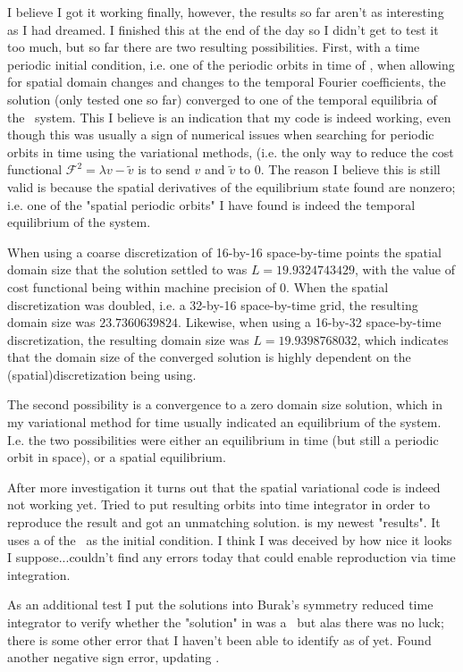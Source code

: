I believe I got it working finally, however, the results so far aren't as
interesting as I had dreamed. I finished this at the end of the day so I didn't
get to test it too much, but so far there are two resulting possibilities.
First, with a time periodic initial condition, i.e. one of the periodic orbits
in time of \KS, when allowing for spatial domain changes and changes to the
temporal Fourier coefficients, the solution (only tested one so far) converged
to one of the temporal equilibria of the \KS\ system. This I believe is an
indication that my code is indeed working, even though this was usually a sign
of numerical issues when searching for periodic orbits in time using the
variational methods, (i.e. the only way to reduce the cost functional
$\mathcal{F}^2 = \lambda v - \tilde{v}$ is to send $v$ and $\tilde{v}$ to $0$.
The reason I believe this is still valid is because the spatial derivatives of
the equilibrium state found are nonzero; i.e. one of the "spatial periodic
orbits" I have found is indeed the temporal equilibrium of the system.

When using a coarse discretization of 16-by-16 space-by-time points
the spatial domain size that the solution settled to was $L=19.9324743429$, with the
value of cost functional being within machine precision of $0$.
When the spatial discretization was doubled, i.e. a 32-by-16 space-by-time
grid, the resulting domain size was $23.7360639824$.
Likewise, when using a 16-by-32 space-by-time discretization, the resulting domain size was $L=19.9398768032$, which indicates that the
domain size of the converged solution is highly dependent on the (spatial)discretization being using.

The second possibility is a convergence to a zero domain size solution, which in my variational method for time usually indicated an equilibrium of
the system. I.e. the two possibilities were either an equilibrium in time (but still a periodic orbit in space), or a spatial equilibrium.

After more investigation it turns out that the spatial variational code is indeed not working yet. Tried to put
resulting orbits into time integrator in order to reproduce the result and got an unmatching solution.
 is my
newest "results". It uses a  of the \KSe\ as the initial condition. I think I was deceived by how nice it looks
I suppose...couldn't find any errors today that could enable reproduction via time integration.

As an additional test I put the solutions into Burak's symmetry reduced time integrator to verify whether
the "solution" in  was a \rpo\ but alas there was no luck; there is some other error
that I haven't been able to identify as of yet.
Found another negative sign error, updating .

